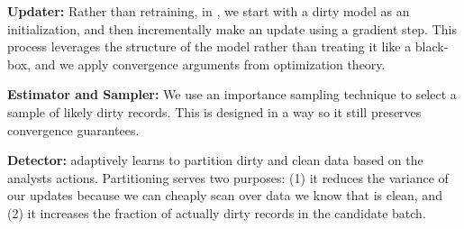   \noindent\textbf{Updater: } Rather than retraining, in \sys, we start with a dirty model as an initialization, and then incrementally make an update using a gradient step.
  This process leverages the structure of the model rather than treating it like a black-box, and we apply convergence arguments from optimization theory.

  \vspace{0.5em}

  \noindent\textbf{Estimator and Sampler: } We use an importance sampling technique to select a sample of likely dirty records. This is designed in a way so it still preserves convergence guarantees.

  \vspace{0.5em}

  \noindent\textbf{Detector: } \sys adaptively learns to partition dirty and clean data based on the analysts actions.
  Partitioning serves two purposes: (1) it reduces the variance of our updates because we can cheaply scan over data we know that is clean, and (2) it increases the fraction of actually dirty records in the candidate batch.

